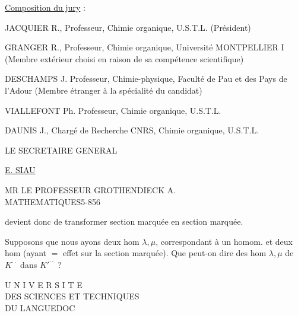 \uline{Composition du jury} :

JACQUIER R., Professeur, Chimie organique, U.S.T.L. (Président)

GRANGER R., Professeur, Chimie organique, Université MONTPELLIER I (Membre extérieur choisi en raison de sa compétence scientifique)

DESCHAMPS J. Professeur, Chimie-physique, Faculté de Pau et des Pays de l'Adour (Membre étranger à la spécialité du candidat)

VIALLEFONT Ph. Professeur, Chimie organique, U.S.T.L.

DAUNIS J., Chargé de Recherche CNRS, Chimie organique, U.S.T.L.

LE SECRETAIRE GENERAL


\uline{E. SIAU}

MR LE PROFESSEUR GROTHENDIECK A.\\
MATHEMATIQUES\hfill 5-856


devient donc de transformer section marquée en section marquée.

Supposons que nous ayons deux hom $\lambda,\mu$, correspondant à un \uuline{$=$} homom.
et deux hom
(ayant $=$ effet sur la section marquée).
Que peut-on dire des hom $\lambda,\mu$ de $K^{\cdot\cdot}$ dans $K'^{\cdot\cdot}$ ?


U N I V E R S I T E\\
DES SCIENCES ET TECHNIQUES\\
DU LANGUEDOC

